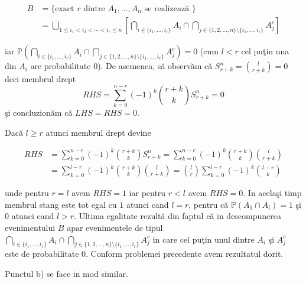 \documentclass[]{article}
\def\PP{{\mathbb P}}
\begin{document}
\begin{align*}
  B &= \{\mbox{exact $r$ dintre $A_1,\dots, A_n$ se realizeaz\u a }\}\\
  &= \bigcup_{1\leq i_1<i_2<\cdots<i_r\leq n}\left[\bigcap_{i\in\{i_1,\dots,i_r\}}A_i\cap\bigcap_{j\in\{1,2,\dots,n\}\setminus\{i_1,\dots,i_r\}}A_j^c\right]
\end{align*}

iar
\(\PP\left(\bigcap_{i\in\{i_1,\dots,i_r\}}A_i\cap\bigcap_{j\in\{1,2,\dots,n\}\setminus\{i_1,\dots,i_r\}}A_j^c\right)=0\)
(cum \(l<r\) cel pu\c tin una din \(A_i\) are probabilitate \(0\)). De
asemenea, s\u a observ\u am c\u a \(S_{r+k}^{n}=\binom{l}{r+k}=0\) deci
membrul drept \[
  RHS=\displaystyle\sum_{k=0}^{n-r}(-1)^k\binom{r+k}{k}S_{r+k}^{n}=0
\] \c si concluzion\u am c\u a \(LHS=RHS=0\).

Dac\u a \(l\geq r\) atunci membrul drept devine

\begin{align*}
  RHS &= \displaystyle\sum_{k=0}^{n-r}(-1)^k\binom{r+k}{k}S_{r+k}^{n} = \displaystyle\sum_{k=0}^{n-r}(-1)^k\binom{r+k}{k}\binom{l}{r+k}\\
  &= \displaystyle\sum_{k=0}^{l-r}(-1)^k\binom{r+k}{k}\binom{l}{r+k}= \binom{l}{r}\displaystyle\sum_{k=0}^{l-r}(-1)^k\binom{l-r}{k}
\end{align*}

unde pentru \(r=l\) avem \(RHS=1\) iar pentru \(r<l\) avem \(RHS=0\). In
acela\c si timp membrul stang este tot egal cu \(1\) atunci cand
\(l=r\), pentru c\u a \(\PP(A_1\cap A_l)=1\) \c si \(0\) atunci cand
\(l>r\). Ultima egalitate rezult\u a din faptul c\u a in descompunerea
evenimentului \(B\) apar evenimentele de tipul
\(\bigcap_{i\in\{i_1,\dots,i_r\}}A_i\cap\bigcap_{j\in\{1,2,\dots,n\}\setminus\{i_1,\dots,i_r\}}A_j^c\)
in care cel pu\c tin unul dintre \(A_i\) \c si \(A_j^c\) este de
probabilitate \(0\). Conform problemei precedente avem rezultatul dorit.

Punctul b) se face in mod similar.
\end{document}
